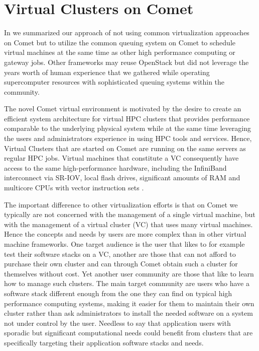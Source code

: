 \documentclass[sigconf,hyphens]{acmart}
\begin{document}
\section{Virtual Clusters on Comet}\label{sec:vc}

In \cite{comet-vc} we summarized our approach of not using common
virtualization approaches on Comet but to utilize the common queuing
system on Comet to schedule virtual machines at the same time as other
high performance computing or gateway jobs. Other frameworks may reuse
OpenStack but did not leverage the years worth of human experience
that we gathered while operating supercomputer resources with
sophisticated queuing systems within the community.

The novel Comet virtual environment is motivated by the desire to
create an efficient system architecture for virtual HPC clusters that
provides performance comparable to the underlying physical system
while at the same time leveraging the users and administrators
experience in using HPC tools and services. Hence, Virtual Clusters
that are started on Comet are running on the same servers as regular
HPC jobs. Virtual machines that constitute a VC consequently have
access to the same high-performance hardware, including the InfiniBand
interconnect via SR-IOV, local flash drives, significant amounts of
RAM and multicore CPUs with vector instruction sets \cite{comet-vc}.

The important difference to other virtualization efforts is that on
Comet we typically are not concerned with the management of a single
virtual machine, but with the management of a virtual cluster (VC)
that uses many virtual machines. Hence the concepts and needs by users
are more complex than in other virtual machine frameworks. One target
audience is the user that likes to for example test their software
stacks on a VC, another are those that can not afford to purchase
their own cluster and can through Comet obtain such a cluster for
themselves without cost. Yet another user community are those that
like to learn how to manage such clusters. The main target community
are users who have a software stack different enough from the one they
can find on typical high performance computing systems, making it
easier for them to maintain their own cluster rather than ask
administrators to install the needed software on a system not under
control by the user. Needless to say that application users with
sporadic but significant computational needs could benefit from
clusters that are specifically targeting their application software
stacks and needs.
\end{document}
